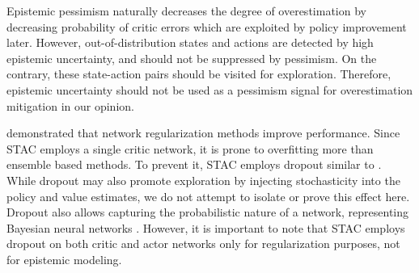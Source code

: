 \documentclass[10pt]{article} %
\begin{document}
Epistemic pessimism naturally decreases the degree of overestimation by decreasing probability of critic errors which are exploited by policy improvement later. However, out-of-distribution states and actions are detected by high epistemic uncertainty, and should not be suppressed by pessimism. On the contrary, these state-action pairs should be visited for exploration. Therefore, epistemic uncertainty should not be used as a pessimism signal for overestimation mitigation in our opinion. 

\citep{nauman2024overestimation} demonstrated that network regularization methods improve performance. Since STAC employs a single critic network, it is prone to overfitting more than ensemble based methods. To prevent it, STAC employs dropout \citep{srivastava2014dropout} similar to \citet{hiraoka2021dropout}. While dropout may also promote exploration by injecting stochasticity into the policy and value estimates, we do not attempt to isolate or prove this effect here. Dropout also allows capturing the probabilistic nature of a network, representing Bayesian neural networks \citep{Gal2016Dropout}. However, it is important to note that STAC employs dropout on both critic and actor networks only for regularization purposes, not for epistemic modeling. 
\end{document}
